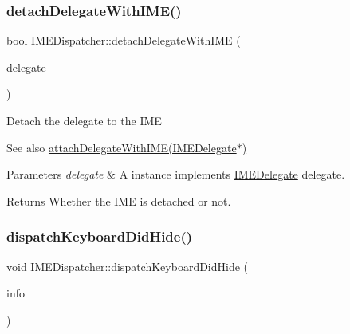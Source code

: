 \subsubsection{\texorpdfstring{detach\+Delegate\+With\+I\+M\+E()}{detachDelegateWithIME()}\hspace{0.1cm}{\footnotesize\ttfamily [2/2]}}
{\footnotesize\ttfamily bool I\+M\+E\+Dispatcher\+::detach\+Delegate\+With\+I\+ME (\begin{DoxyParamCaption}\item[{\hyperlink{classIMEDelegate}{I\+M\+E\+Delegate} $\ast$}]{delegate }\end{DoxyParamCaption})\hspace{0.3cm}{\ttfamily [protected]}}

Detach the delegate to the I\+ME \begin{DoxySeeAlso}{See also}
{\ttfamily \hyperlink{classIMEDispatcher_a5d08b8699ff78fb42b065b4030f8ea11}{attach\+Delegate\+With\+I\+M\+E(\+I\+M\+E\+Delegate$\ast$)}} 
\end{DoxySeeAlso}

\begin{DoxyParams}{Parameters}
{\em delegate} & A instance implements \hyperlink{classIMEDelegate}{I\+M\+E\+Delegate} delegate. \\
\hline
\end{DoxyParams}
\begin{DoxyReturn}{Returns}
Whether the I\+ME is detached or not. 
\end{DoxyReturn}
\mbox{\label{classIMEDispatcher_a60699adf2ac55bcb25d1b7782299ec6e}} 
\subsubsection{\texorpdfstring{dispatch\+Keyboard\+Did\+Hide()}{dispatchKeyboardDidHide()}\hspace{0.1cm}{\footnotesize\ttfamily [1/2]}}
{\footnotesize\ttfamily void I\+M\+E\+Dispatcher\+::dispatch\+Keyboard\+Did\+Hide (\begin{DoxyParamCaption}\item[{\hyperlink{structIMEKeyboardNotificationInfo}{I\+M\+E\+Keyboard\+Notification\+Info} \&}]{info }\end{DoxyParamCaption})}

